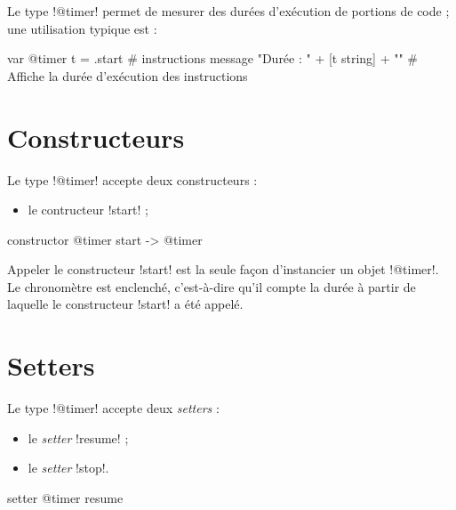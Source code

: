 



Le type \ggst!@timer! permet de mesurer des durées d'exécution de portions de code ; une utilisation typique est :

\begin{galgas3}
var @timer t = .start
  # instructions
message "Durée : " + [t string] + "\n" # Affiche la durée d'exécution des instructions
\end{galgas3}


\section{Constructeurs}

Le type \ggst!@timer! accepte deux constructeurs :
\begin{itemize}
  \item le contructeur \ggst!start! ;
\end{itemize}



\begin{galgas3box}
constructor @timer start -> @timer
\end{galgas3box}

Appeler le constructeur \ggst!start! est la seule façon d'instancier un objet \ggst!@timer!. Le chronomètre est enclenché, c'est-à-dire qu'il compte la durée à partir de laquelle le constructeur \ggst!start! a été appelé.







\section{Setters}

Le type \ggst!@timer! accepte deux \emph{setters} :
\begin{itemize}
  \item le \emph{setter} \ggst!resume! ;
  \item le \emph{setter} \ggst!stop!.
\end{itemize}


\begin{galgas3box}
setter @timer resume
\end{galgas3box}

